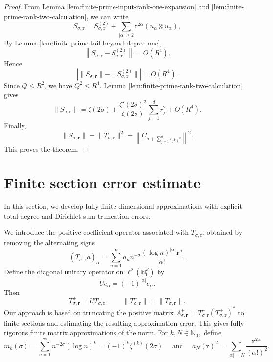 \documentclass[12pt, reqno]{amsart}
\numberwithin{equation}{section}
\begin{document}
\begin{proof}
From Lemma \ref{lem:finite-prime-input-rank-one-expansion} and \ref{lem:finite-prime-rank-two-calculation}, we can write
\[
S_{\sigma,\boldsymbol{r}}
=
S_{\sigma,\boldsymbol{r}}^{(2)}
+
\sum_{|\alpha|\geq 2}
\boldsymbol{r}^{2\alpha}(u_{\alpha}\otimes u_{\alpha}),
\]
By Lemma \ref{lem:finite-prime-tail-beyond-degree-one},
\[
\left\|
S_{\sigma,\boldsymbol{r}}-S_{\sigma,\boldsymbol{r}}^{(2)}
\right\|
=
O(R^4).
\]
Hence
\[
\left|
\|S_{\sigma,\boldsymbol{r}}\|
-
\|S_{\sigma,\boldsymbol{r}}^{(2)}\|
\right|
=
O(R^4).
\]
%
Since \(Q\leq R^2\), we have \(Q^2\leq R^4\).  Lemma \ref{lem:finite-prime-rank-two-calculation} gives
\[
\|S_{\sigma,\boldsymbol{r}}\|
=
\zeta(2\sigma)
+
\frac{\zeta'(2\sigma)^2}{\zeta(2\sigma)}
\sum_{j=1}^{d}r_j^2
+
O(R^4).
\]
Finally,
\[
\|S_{\sigma,\boldsymbol{r}}\|
= \|T_{\sigma,\boldsymbol{r}}\|^2=
\left\|C_{\sigma+\sum_{j=1}^{d}r_jp_j^{-s}}\right\|^{2}.
\]
This proves the theorem.
\end{proof}

\section{Finite section error estimate}
\label{sec:5}
In this section, we develop fully finite-dimensional approximations with explicit total-degree and Dirichlet-sum truncation errors.

We introduce the positive coefficient operator associated with \(T_{\sigma, \boldsymbol{r}}\), obtained by removing the alternating signs
\[
(T_{\sigma,\boldsymbol{r}}^{+}a)_{\alpha}
=
\sum_{n=1}^{\infty}
a_n n^{-\sigma}
\frac{(\log n)^{|\alpha|}\boldsymbol{r}^{\alpha}}{\alpha!}.
\]
Define the diagonal unitary operator on $\ell^2(\mathbb{N}_0^d)$ by
\[
Ue_\alpha=(-1)^{|\alpha|}e_\alpha.
\]
Then
\[
T^+_{\sigma,\boldsymbol r}
=UT_{\sigma,\boldsymbol r},
\qquad
\|T^+_{\sigma,\boldsymbol r}\|
=
\|T_{\sigma,\boldsymbol r}\|.
\]
Our approach is based on truncating the positive matrix $A_{\sigma,\boldsymbol{r}}^{+}
=T_{\sigma,\boldsymbol{r}}^{+}(T_{\sigma,\boldsymbol{r}}^{+})^{*}$ to finite sections and estimating the resulting approximation error. This gives fully rigorous finite matrix approximations of the norm.
For $k,N\in\mathbb{N}_{0},$ define
\[
m_k(\sigma)
=
\sum_{n=1}^{\infty}n^{-2\sigma}(\log n)^k = (-1)^k\zeta^{(k)}(2\sigma) \quad \text{ and } \quad a_N(\boldsymbol{r})^2 =
\sum_{|\alpha|=N}
\frac{\boldsymbol{r}^{2\alpha}}{(\alpha!)^2}.
\]
\end{document}
